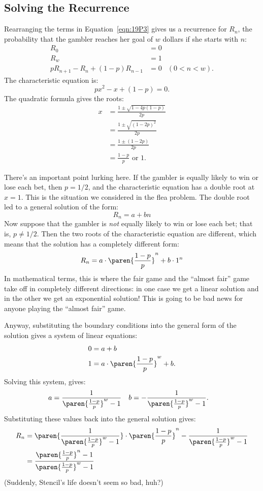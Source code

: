 \subsection{Solving the Recurrence}

Rearranging the terms in Equation~\ref{eqn:19P3} gives us a recurrence
for $R_n$, the probability that the gambler reaches her goal of $w$
dollars if she starts with $n$:
%
\begin{align*}
R_0 & = 0 \\
R_w & = 1 \\
p R_{n + 1} - R_n + (1 - p) R_{n - 1} &= 0
& (0 < n < w).
\end{align*}
%
The characteristic equation is:
%
\[
    p x^2 - x + (1-p) = 0.
\]
%
The quadratic formula gives the roots:
%
\begin{align*}
x & = \frac{1 \pm \sqrt{1 - 4 p (1-p)}}{2p} \\
  & = \frac{1 \pm \sqrt{(1-2p)^2}}{2p} \\
  & = \frac{1 \pm (1-2p)}{2p} \\
  & = \frac{1-p}{p} \text{ or } 1.
\end{align*}

There's an important point lurking here.  If the gambler is equally
likely to win or lose each bet, then $p = 1/2$, and the characteristic
equation has a double root at $x = 1$.  This is the situation we
considered in the flea problem.  The double root led to a general
solution of the form:
%
\[
R_n = a + b n
\]
%
Now suppose that the gambler is \emph{not} equally likely to win or
lose each bet; that is, $p \neq 1/2$.  Then the two roots of the
characteristic equation are different, which means that the solution
has a completely different form:
%
\[
R_n = a \cdot \paren{\frac{1-p}{p}}^n + b \cdot 1^n
\]
%
In mathematical terms, this is where the fair game and the ``almost
fair'' game take off in completely different directions: in one case
we get a linear solution and in the other we get an exponential
solution!  This is going to be bad news for anyone playing the
``almost fair'' game.

Anyway, substituting the boundary conditions into the general form of
the solution gives a system of linear equations:
%
\begin{align*}
0 & = a + b \\
1 & = a \cdot \paren{\frac{1-p}{p}}^w + b.
\end{align*}
%
Solving this system, gives:
%
\begin{align*}
a & = \frac{1}{\paren{\frac{1-p}{p}}^w-1} &
b & = - \frac{1}{\paren{\frac{1-p}{p}}^w-1}. &
\end{align*}
%
Substituting these values back into the general solution gives:
%
\begin{align*}
R_n
    & = \paren{\frac{1}{\paren{\frac{1-p}{p}}^w-1}} \cdot
        \paren{\frac{1-p}{p}}^n - \frac{1}{\paren{\frac{1-p}{p}}^w-1} \\
    & = \frac{\paren{\frac{1-p}{p}}^n-1}{\paren{\frac{1-p}{p}}^w-1}
\end{align*}
%
(Suddenly, Stencil's life doesn't seem so bad, huh?)

